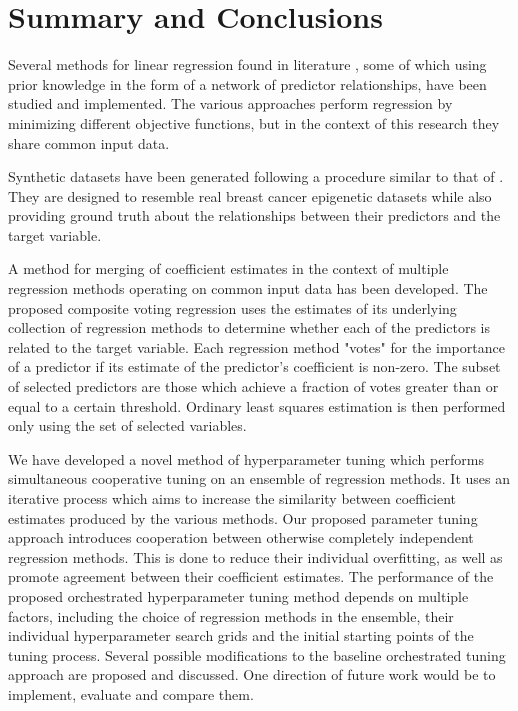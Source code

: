 \chapter{Summary and Conclusions}
Several methods for linear regression found in literature \cite{tibshirani1996regression,zou2005regularization,li2008network,li2010variable,pan2010incorporating,luo2012two,kim2013network}, some of which using prior knowledge in the form of a network of predictor relationships, have been studied and implemented. The various approaches perform regression by minimizing different objective functions, but in the context of this research they share common input data.

Synthetic datasets have been generated following a procedure similar to that of \cite{li2008network}. They are designed to resemble real breast cancer epigenetic datasets while also providing ground truth about the relationships between their predictors and the target variable.

A method for merging of coefficient estimates in the context of multiple regression methods operating on common input data has been developed. The proposed composite voting regression uses the estimates of its underlying collection of regression methods to determine whether each of the predictors is related to the target variable. Each regression method "votes" for the importance of a predictor if its estimate of the predictor's coefficient is non-zero. The subset of selected predictors are those which achieve a fraction of votes greater than or equal to a certain threshold. Ordinary least squares estimation is then performed only using the set of selected variables.

We have developed a novel method of hyperparameter tuning which performs simultaneous cooperative tuning on an ensemble of regression methods. It uses an iterative process which aims to increase the similarity between coefficient estimates produced by the various methods. Our proposed parameter tuning approach introduces cooperation between otherwise completely independent regression methods. This is done to reduce their individual overfitting, as well as promote agreement between their coefficient estimates. The performance of the proposed orchestrated hyperparameter tuning method depends on multiple factors, including the choice of regression methods in the ensemble, their individual hyperparameter search grids and the initial starting points of the tuning process. Several possible modifications to the baseline orchestrated tuning approach are proposed and discussed. One direction of future work would be to implement, evaluate and compare them.

